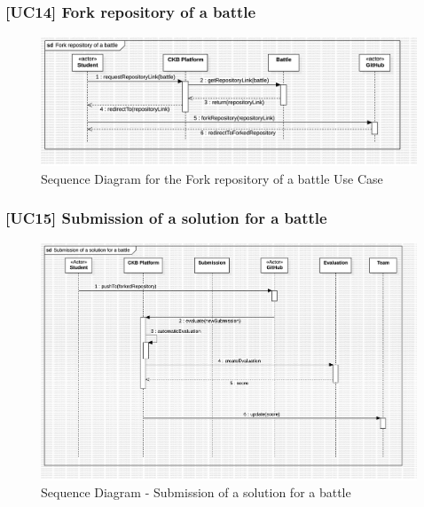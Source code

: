 \subsubsection*{[UC14] Fork repository of a battle}
\begin{figure}[H]
    \centering
    \includegraphics[width=\textwidth]{Diagrams/UC14SequenceDiagram.jpg}
    \caption{Sequence Diagram for the Fork repository of a battle Use Case}
    \label{fig:sequence-diagram-fork-repository}
\end{figure}

\subsubsection*{[UC15] Submission of a solution for a battle}
\begin{figure}[H]
    \centering
    \includegraphics[width=\textwidth]{Diagrams/Submission.jpg}
    \caption{Sequence Diagram - Submission of a solution for a battle}
    \label{fig:sequence-diagram-submission}
\end{figure}

